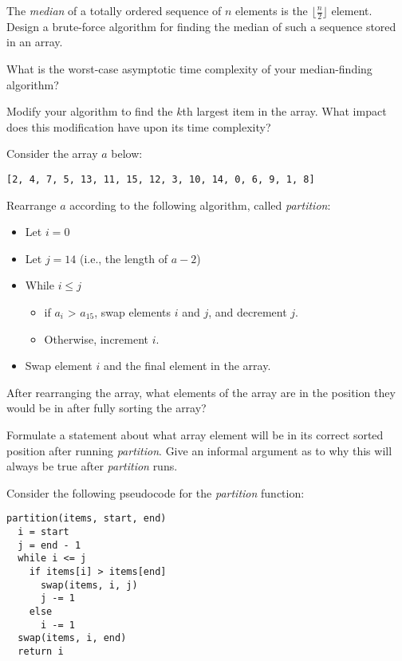 \documentclass{tufte-handout}
\begin{document}
\begin{questions}
\item The \emph{median} of a totally ordered sequence of $n$ elements is the $\lfloor \frac{n}{2} \rfloor$ element. Design a brute-force algorithm for finding the median of such a sequence stored in an array.

\item What is the worst-case asymptotic time complexity of your median-finding algorithm?

\item Modify your algorithm to find the $k$th largest item in the array. What impact does this modification have upon its time complexity?

\item Consider the array $a$ below:

\begin{verbatim}
[2, 4, 7, 5, 13, 11, 15, 12, 3, 10, 14, 0, 6, 9, 1, 8]
\end{verbatim}

Rearrange $a$ according to the following algorithm, called \emph{partition}:
\begin{itemize}
    \item Let $i = 0$
    \item Let $j = 14$ (i.e., the length of $a - 2$)
    \item While $i \le j$
    \begin{itemize}
        \item if $a_i$ > $a_{15}$, swap elements $i$ and $j$, and decrement $j$.
        \item Otherwise, increment $i$.
    \end{itemize}
    \item Swap element $i$ and the final element in the array.
\end{itemize}

\item After rearranging the array, what elements of the array are in the position they would be in after fully sorting the array?

\item Formulate a statement about what array element will be in its correct sorted position after running \emph{partition}. Give an informal argument as to why this will always be true after  \emph{partition} runs.

\item Consider the following pseudocode for the \emph{partition} function:
\begin{verbatim}
partition(items, start, end)
  i = start
  j = end - 1
  while i <= j
    if items[i] > items[end]
      swap(items, i, j)
      j -= 1
    else
      i -= 1
  swap(items, i, end)
  return i
\end{verbatim}


\end{questions}
\end{document}
